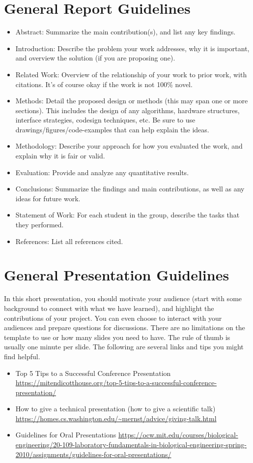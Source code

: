 \documentclass[a4paper,12pt,twoside]{article}
\begin{document}
\section{General Report Guidelines}
\begin{itemize}
    \item Abstract: Summarize the main contribution(s), and list any key findings.
    \item Introduction: Describe the problem your work addresses, why it is important, and overview the solution (if you are proposing one).
    \item Related Work: Overview of the relationship of your work to prior work, with citations. It’s of course okay if the work is not 100\% novel.
    \item Methods: Detail the proposed design or methods (this may span one or more sections). This includes the design of any algorithms, hardware structures, interface strategies, codesign techniques, etc. Be sure to use drawings/figures/code-examples that can help explain the ideas.
    \item Methodology: Describe your approach for how you evaluated the work, and explain why it is fair or valid.
    \item Evaluation: Provide and analyze any quantitative results.
    \item Conclusions: Summarize the findings and main contributions, as well as any ideas for future work.
    \item Statement of Work: For each student in the group, describe the tasks that they performed.
    \item References: List all references cited.
\end{itemize}

\section{General Presentation Guidelines}
In this short presentation, you should motivate your audience (start with some background to connect with what we have learned), and highlight the contributions of your project. You can even choose to interact with your audiences and prepare questions for discussions. There are no limitations on the template to use or how many slides you need to have. The rule of thumb is usually one minute per slide. The following are several links and tips you might find helpful.
\begin{itemize}
    \item Top 5 Tips to a Successful Conference Presentation \url{https://mitendicotthouse.org/top-5-tips-to-a-successful-conference-presentation/}
    \item How to give a technical presentation (how to give a scientific talk) \url{https://homes.cs.washington.edu/~mernst/advice/giving-talk.html}
    \item Guidelines for Oral Presentations \url{https://ocw.mit.edu/courses/biological-engineering/20-109-laboratory-fundamentals-in-biological-engineering-spring-2010/assignments/guidelines-for-oral-presentations/}
\end{itemize}
\end{document}
